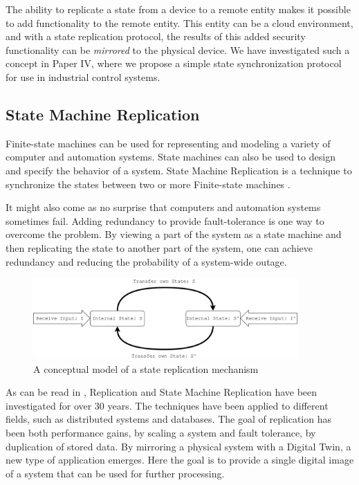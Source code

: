 The ability to replicate a state from a device to a remote entity makes it possible to add functionality to the remote entity. This entity can be a cloud environment, and with a state replication protocol, the results of this added security functionality can be \emph{mirrored} to the physical device. We have investigated such a concept in Paper IV, where we propose a simple state synchronization protocol for use in industrial control systems.

\subsection{State Machine Replication}
Finite-state machines can be used for representing and modeling a variety of computer and automation systems. State machines can also be used to design and specify the behavior of a system. State Machine Replication is a technique to synchronize the states between two or more Finite-state machines \cite{lamport1984using}. 

It might also come as no surprise that computers and automation systems sometimes fail. Adding redundancy to provide fault-tolerance is one way to overcome the problem. By viewing a part of the system as a state machine and then replicating the state to another part of the system, one can achieve redundancy and reducing the probability of a system-wide outage. 


\begin{figure}[h]
\centering
\includegraphics[width=0.9\textwidth]{images/State_replication.pdf}
\caption{A conceptual model of a state replication mechanism}
\label{fig:state-replication}
\end{figure}

As can be read in \cite{charron2010replication}, Replication and State Machine Replication have been investigated for over 30 years. The techniques have been applied to different fields, such as distributed systems and databases. The goal of replication has been both performance gains, by scaling a system and fault tolerance, by duplication of stored data. By mirroring a physical system with a Digital Twin, a new type of application emerges. Here the goal is to provide a single digital image of a system that can be used for further processing.

